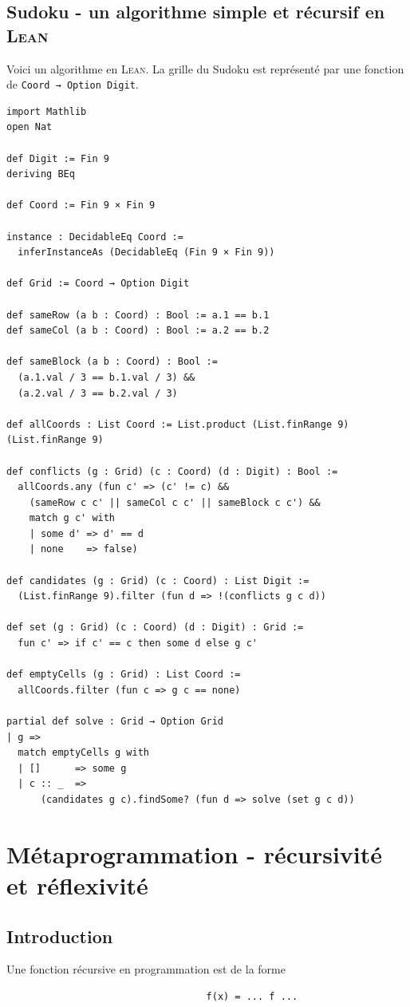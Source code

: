 \subsection{Sudoku - un algorithme simple et récursif en \textsc{Lean}}
Voici un algorithme en \textsc{Lean}. 
La grille du Sudoku est représenté par une fonction de \texttt{Coord → Option Digit}.
\begin{verbatim}
import Mathlib
open Nat

def Digit := Fin 9
deriving BEq

def Coord := Fin 9 × Fin 9

instance : DecidableEq Coord :=
  inferInstanceAs (DecidableEq (Fin 9 × Fin 9))

def Grid := Coord → Option Digit

def sameRow (a b : Coord) : Bool := a.1 == b.1
def sameCol (a b : Coord) : Bool := a.2 == b.2

def sameBlock (a b : Coord) : Bool :=
  (a.1.val / 3 == b.1.val / 3) &&
  (a.2.val / 3 == b.2.val / 3)

def allCoords : List Coord := List.product (List.finRange 9) (List.finRange 9)

def conflicts (g : Grid) (c : Coord) (d : Digit) : Bool :=
  allCoords.any (fun c' => (c' != c) &&
    (sameRow c c' || sameCol c c' || sameBlock c c') &&
    match g c' with
    | some d' => d' == d
    | none    => false)

def candidates (g : Grid) (c : Coord) : List Digit :=
  (List.finRange 9).filter (fun d => !(conflicts g c d))

def set (g : Grid) (c : Coord) (d : Digit) : Grid :=
  fun c' => if c' == c then some d else g c'

def emptyCells (g : Grid) : List Coord :=
  allCoords.filter (fun c => g c == none)

partial def solve : Grid → Option Grid
| g =>
  match emptyCells g with
  | []      => some g
  | c :: _  =>
      (candidates g c).findSome? (fun d => solve (set g c d))

\end{verbatim}

\section{Métaprogrammation - récursivité et réflexivité}
\subsection{Introduction}
Une fonction récursive en programmation est de la forme
\begin{center}	
\begin{Verbatim}
                                   f(x) = ... f ...
\end{Verbatim}
\end{center}

